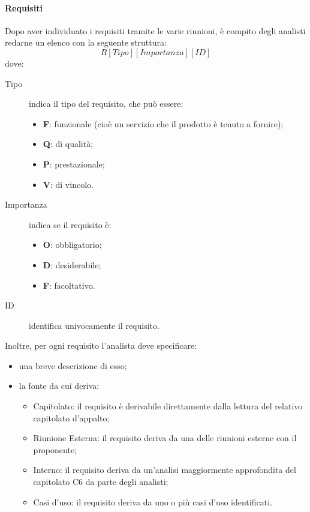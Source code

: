 		\paragraph{Requisiti} 
		Dopo aver individuato i requisiti tramite le varie riunioni, è compito degli analisti redarne un elenco con la seguente struttura:
			\[R[Tipo][Importanza][ID]\]
		dove:
		\begin{description}
			\item[Tipo] indica il tipo del requisito, che può essere:
				\begin{itemize}
					\item \textbf{F}: funzionale (cioè un servizio che il prodotto è tenuto a fornire);
					\item \textbf{Q}: di qualità;
					\item \textbf{P}: prestazionale;
					\item \textbf{V}: di vincolo.
			\end{itemize}
			\item[Importanza] indica se il requisito è:
			\begin{itemize}
				\item \textbf{O}: obbligatorio;
				\item \textbf{D}: desiderabile;
				\item \textbf{F}: facoltativo. 
			\end{itemize}
			\item[ID] identifica univocamente il requisito.
		\end{description}
		Inoltre, per ogni requisito l'analista deve specificare:
		\begin{itemize}
			\item una breve descrizione di esso;
			\item la fonte da cui deriva:
			\begin{itemize}
				\item Capitolato: il requisito è derivabile direttamente dalla lettura del relativo capitolato d'appalto;
				\item Riunione Esterna: il requisito deriva da una delle riunioni esterne con il proponente;
				\item Interno: il requisito deriva da un'analisi maggiormente approfondita del capitolato C6 da parte degli analisti;
				\item Casi d'uso: il requisito deriva da uno o più casi d'uso identificati.
			\end{itemize}
		\end{itemize}
